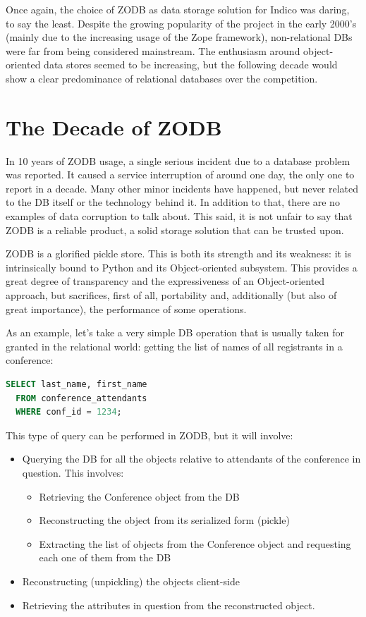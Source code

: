 \par Once again, the choice of ZODB as data storage solution for Indico was daring, to say the least. Despite the growing popularity of the project in the early 2000's (mainly due to the increasing usage of the Zope framework), non-relational DBs were far from being considered mainstream. The enthusiasm around object-oriented data stores seemed to be increasing, but the following decade would show a clear predominance of relational databases over the competition.

\section{The Decade of ZODB} 

\par In 10 years of ZODB usage, a single serious incident due to a database problem was reported. It caused a service interruption of around one day, the only one to report in a decade. Many other minor incidents have happened, but never related to the DB itself or the technology behind it. In addition to that, there are no examples of data corruption to talk about. This said, it is not unfair to say that ZODB is a reliable product, a solid storage solution that can be trusted upon.

ZODB is a glorified pickle store. This is both its strength and its weakness: it is intrinsically bound to Python and its Object-oriented subsystem. This provides a great degree of transparency and the expressiveness of an Object-oriented approach, but sacrifices, first of all, portability and, additionally (but also of great importance), the performance of some operations.

As an example, let's take a very simple DB operation that is usually taken for granted in the relational world: getting the list of names of all registrants in a conference:

\begin{lstlisting}[language=SQL]
  SELECT last_name, first_name
  FROM conference_attendants
  WHERE conf_id = 1234;
\end{lstlisting}

This type of query can be performed in ZODB, but it will involve:

\begin{itemize}
  \item Querying the DB for all the objects relative to attendants of the conference in question. This involves:

  \begin{itemize}
    \item Retrieving the Conference object from the DB
    \item Reconstructing the object from its serialized form (pickle)
    \item Extracting the list of objects from the Conference object and requesting each one of them from the DB
  \end{itemize}
  \item Reconstructing (unpickling) the objects client-side
  \item Retrieving the attributes in question from the reconstructed object.
\end{itemize}

